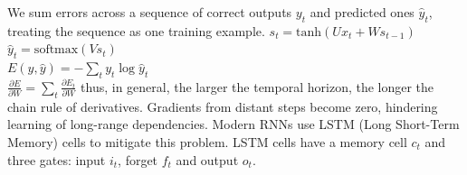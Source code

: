 We sum errors across a sequence of correct outputs $y_t$ and predicted ones
$\hat{y}_t$, treating the sequence as one training example.
$s_t=\text{tanh}(Ux_t+Ws_{t-1})$\\
$\hat{y}_t=\text{softmax}(Vs_t)$\\
$E(y,\hat{y})=-\sum_{t}y_t\log\hat{y}_t$\\
$\frac{\partial E}{\partial W}=\sum_{t}\frac{\partial E_t}{\partial W}$
thus, in general, the larger the temporal horizon, the longer the chain rule of derivatives.
Gradients from distant steps become zero, hindering learning of long-range dependencies.
Modern RNNs use LSTM (Long Short-Term Memory) cells to mitigate this problem.
LSTM cells have a memory cell $c_t$ and three gates: input $i_t$, forget $f_t$ and output $o_t$.